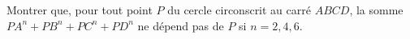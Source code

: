 Montrer que, pour tout point $P$ du cercle circonscrit au carré $ABCD$, la somme $PA^n + PB^n + PC^n + PD^n$ ne dépend pas de $P$ si $n = 2, 4, 6$.
